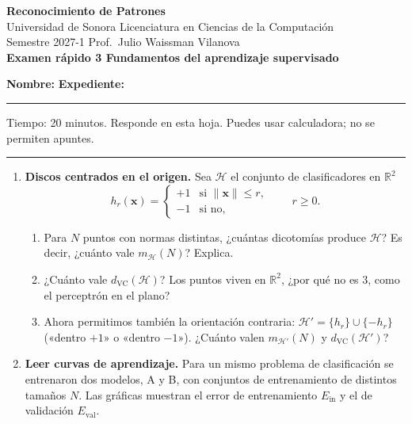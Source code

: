 \documentclass[11pt]{article}
\newcommand{\Ein}{E_{\text{in}}}
\newcommand{\Hyp}{\mathcal{H}}
\newcommand{\dvc}{d_{\text{VC}}}
\newcommand{\vx}{\mathbf{x}}
\newcommand{\R}{\mathbb{R}}
\newcommand{\encabezado}[2]{%
\begin{center}
{\large\bfseries Reconocimiento de Patrones}\\[2pt]
Universidad de Sonora \textperiodcentered{} Licenciatura en Ciencias de la Computación\\
Semestre 2027-1 \textperiodcentered{} Prof.\ Julio Waissman Vilanova\\[10pt]
{\Large\bfseries #1}%
\ifdefined\tipodoc\\[4pt]{\large\itshape\tipodoc}\fi
\end{center}
\ifdefined\tipodoc\else
\vspace{6pt}
\textbf{Nombre:} \hrulefill\quad \textbf{Expediente:} \rule{3.5cm}{0.4pt}\par
\vspace{6pt}
\fi
#2
\par\medskip\hrule\medskip
}
\newcommand{\espacio}[1]{\par\vspace{#1}}
\newcommand{\nuevapagina}{\newpage}
\begin{document}
\encabezado{Examen rápido 3 \textperiodcentered{} Fundamentos del aprendizaje supervisado}{%
Tiempo: 20 minutos. Responde en esta hoja. Puedes usar calculadora; no se permiten apuntes.}

\begin{enumerate}

\item \textbf{Discos centrados en el origen.} Sea $\Hyp$ el conjunto de clasificadores en $\R^2$
\[
h_r(\vx) = \begin{cases} +1 & \text{si } \lVert \vx \rVert \le r, \\ -1 & \text{si no,} \end{cases} \qquad r \ge 0 .
\]
\begin{enumerate}
  \item Para $N$ puntos con normas distintas, ¿cuántas dicotomías produce $\Hyp$? Es decir, ¿cuánto vale $m_{\Hyp}(N)$? Explica.
  \espacio{2.8cm}

  \item ¿Cuánto vale $\dvc(\Hyp)$? Los puntos viven en $\R^2$, ¿por qué no es 3, como el perceptrón en el plano?
  \espacio{2.5cm}

  \item Ahora permitimos también la orientación contraria: $\Hyp' = \{h_r\} \cup \{-h_r\}$ («dentro $+1$» o «dentro $-1$»). ¿Cuánto valen $m_{\Hyp'}(N)$ y $\dvc(\Hyp')$?
  \espacio{2.8cm}
\end{enumerate}

\nuevapagina
\item \textbf{Leer curvas de aprendizaje.} Para un mismo problema de clasificación se entrenaron dos modelos, A y B, con conjuntos de entrenamiento de distintos tamaños $N$. Las gráficas muestran el error de entrenamiento $\Ein$ y el de validación $E_{\text{val}}$.


\end{enumerate}
\end{document}
